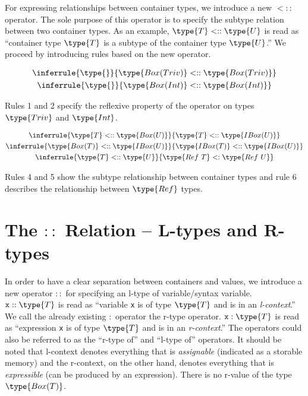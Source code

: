 \documentclass{article}
\newcommand\rtypeof{\mathrel{:}}
\newcommand\ltypeof{\mathrel{::}}
\newcommand\subtype{\mathrel{<:}}
\newcommand\subtypecont{\mathrel{<::}}
\newcommand{\syntax}{\texttt}
\begin{document}
For expressing relationships between container types, we introduce a new
$\subtypecont$ operator. The sole purpose of this operator is to specify the
subtype relation between two container types. As an example, $\type{T}
\subtypecont \type{U}$ is read as ``container type $\type{T}$ is a subtype of
the container type $\type{U}$.'' We proceed by introducing rules based on the
new operator.

\begin{gather}
  \inferrule{\type{}}{\type{Box(Triv)} \subtypecont \type{Box(Triv)}}\\
  \inferrule{\type{}}{\type{Box(Int)} \subtypecont \type{Box(Int)}}
\end{gather}

Rules 1 and 2 specify the reflexive property of the operator on types
$\type{Triv}$ and $\type{Int}$.

\begin{gather}
  \inferrule{\type{T} \subtypecont \type{Box(U)}}{\type{T} \subtypecont \type{IBox(U)}}\\
  \inferrule{\type{Box(T)} \subtypecont \type{IBox(U)}}{\type{IBox(T)} \subtypecont \type{IBox(U)}}\\
  \inferrule{\type{T} \subtypecont \type{U}}{\type{Ref\ T} \subtype \type{Ref\ U}}
\end{gather}

Rules 4 and 5 show the subtype relationship between container types and rule
6 describes the relationship between $\type{Ref}$ types.


\section*{The $\ltypeof$ Relation -- L-types and R-types}

In order to have a clear separation between containers and values, we introduce
a new operator $\ltypeof$ for specifying an l-type of variable/syntax variable.
$\syntax{x} :: \type{T}$ is read as ``variable \syntax{x} is of type $\type{T}$
and is in an \textit{l-context}.'' We call the already existing $\rtypeof$
operator the r-type operator. $\syntax{x} : \type{T}$ is read as ``expression
\syntax{x} is of type $\type{T}$ and is in an \textit{r-context}.'' The
operators could also be referred to as the ``r-type of'' and ``l-type of''
operators. It should be noted that l-context denotes everything that is
\textit{assignable} (indicated as a storable memory) and the r-context, on the
other hand, denotes everything that is \textit{expressible} (can be produced by
an expression). There is no r-value of the type $\type{Box(T)}$.
\end{document}

